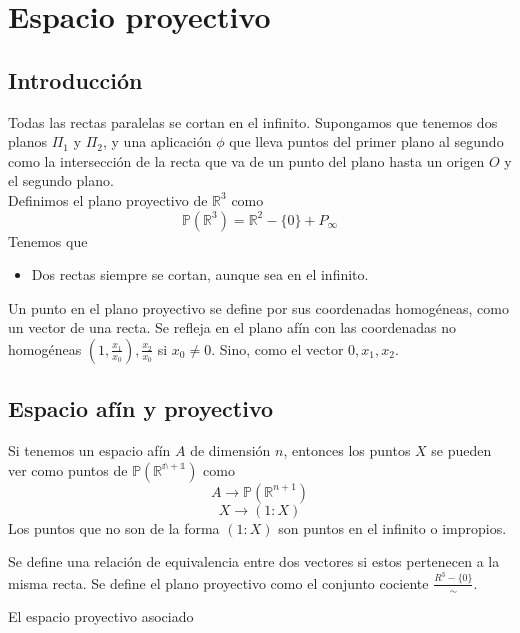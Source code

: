 \documentclass{Geometria.tex}
\begin{document}
\chapter{Espacio proyectivo}
\section{Introducción}
Todas las rectas paralelas se cortan en el infinito. Supongamos que tenemos dos planos
\(\Pi_{1}\) y \(\Pi_{2}\), y una aplicación \(\phi \) que lleva puntos del primer plano al segundo
como la intersección de la recta que va de un punto del plano hasta un origen \(O\) y el segundo
plano.\\
Definimos el plano proyectivo de \(\mathbb{R}^{3}\) como
\[
    \mathbb{P}(\mathbb{R}^{3}) = \mathbb{R}^{2} - \{ 0 \} + P_{\infty}
\]
Tenemos que
\begin{itemize}
    \item Dos rectas siempre se cortan, aunque sea en el infinito.
\end{itemize}
Un punto en el plano proyectivo se define por sus coordenadas homogéneas, como un vector de una
recta. Se refleja en el plano afín con las coordenadas no homogéneas \((1, \frac{x_{1}}{x_{0}})
, \frac{x_{2}}{x_{0}}\) si \(x_{0} \neq 0\). Sino, como el vector \(0, x_{1}, x_{2}\).
\section{Espacio afín y proyectivo}
Si tenemos un espacio afín \(A\) de dimensión \(n\), entonces los puntos \(X\) se pueden ver como
puntos de \(\mathbb{P(R^{n+1})}\) como
\[
    A \to  \mathbb{P}(\mathbb{R}^{n+1})
\]
\[
    X \to (1: X)
\]
Los puntos que no son de la forma \((1:X)\) son puntos en el infinito o impropios.
\begin{defin}
    Se define una relación de equivalencia entre dos vectores si estos pertenecen a la misma recta.
    Se define el plano proyectivo como el conjunto cociente \(\frac{R^{3} - \{ 0 \}}{\sim}\).
\end{defin}
\begin{defin}
    El espacio proyectivo asociado 
\end{defin}
\end{document}
